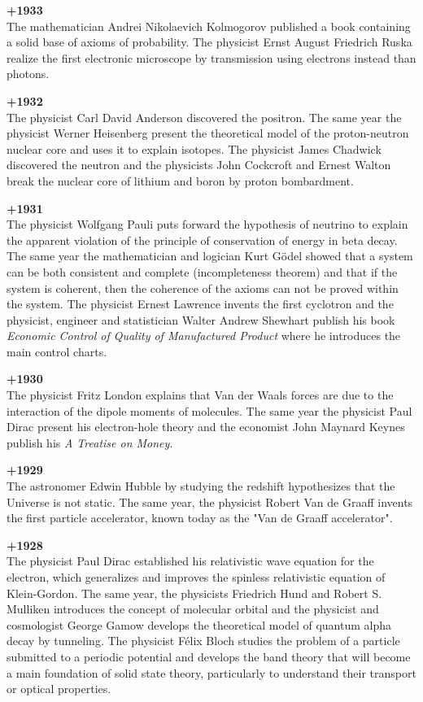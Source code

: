 \textbf{+1933}\\
The mathematician Andrei Nikolaevich Kolmogorov published a book containing a solid base of axioms of probability. The physicist Ernst August Friedrich Ruska realize the first electronic microscope by transmission using electrons instead than photons.

\textbf{+1932}\\
The physicist Carl David Anderson discovered the positron. The same year the physicist Werner Heisenberg present the theoretical model of the proton-neutron nuclear core and uses it to explain isotopes. The physicist James Chadwick discovered the neutron and the physicists John Cockcroft and Ernest Walton break the nuclear core of lithium and boron by proton bombardment.

\textbf{+1931}\\
The physicist Wolfgang Pauli puts forward the hypothesis of neutrino to explain the apparent violation of the principle of conservation of energy in beta decay. The same year the mathematician and logician Kurt Gödel showed that a system can be both consistent and complete (incompleteness theorem) and that if the system is coherent, then the coherence of the axioms can not be proved within the system. The physicist Ernest Lawrence invents the first cyclotron and the physicist, engineer and statistician Walter Andrew Shewhart publish his book \textit{Economic Control of Quality of Manufactured Product} where he introduces the main control charts.

\textbf{+1930}\\
The physicist Fritz London explains that Van der Waals forces are due to the interaction of the dipole moments of molecules. The same year the physicist Paul Dirac present his electron-hole theory and the economist John Maynard Keynes publish his \textit{A Treatise on Money}.

\textbf{+1929}\\
The astronomer Edwin Hubble by studying the redshift hypothesizes that the Universe is not static. The same year, the physicist Robert Van de Graaff invents the first particle accelerator, known today as the "Van de Graaff accelerator".

\textbf{+1928}\\
The physicist Paul Dirac established his relativistic wave equation for the electron, which generalizes and improves the spinless relativistic equation of Klein-Gordon. The same year, the physicists Friedrich Hund and Robert S. Mulliken introduces the concept of molecular orbital and the physicist and cosmologist George Gamow develops the theoretical model of quantum alpha decay by tunneling. The physicist Félix Bloch studies the problem of a particle submitted to a periodic potential and develops the band theory that will become a main foundation of solid state theory, particularly to understand their transport or optical properties.

